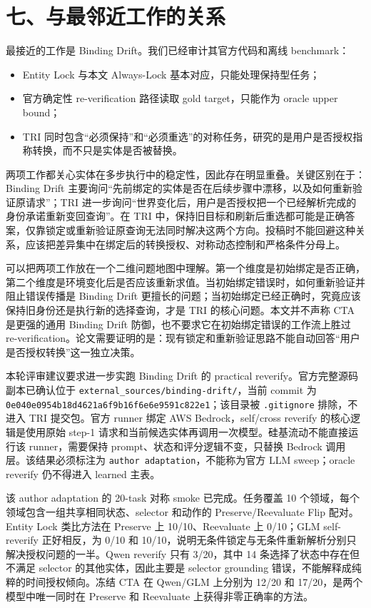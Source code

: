 \documentclass[10pt,fontset=none]{ctexart}
\begin{document}
\section{七、与最邻近工作的关系}
\par 最接近的工作是 Binding Drift。我们已经审计其官方代码和离线 benchmark：
\begin{itemize}
\item Entity Lock 与本文 Always-Lock 基本对应，只能处理保持型任务；
\item 官方确定性 re-verification 路径读取 gold target，只能作为 oracle upper bound；
\item TRI 同时包含“必须保持”和“必须重选”的对称任务，研究的是用户是否授权指称转换，而不只是实体是否被替换。
\end{itemize}
\par 两项工作都关心实体在多步执行中的稳定性，因此存在明显重叠。关键区别在于：Binding Drift 主要询问“先前绑定的实体是否在后续步骤中漂移，以及如何重新验证原请求”；TRI 进一步询问“世界变化后，用户是否授权把一个已经解析完成的身份承诺重新变回查询”。在 TRI 中，保持旧目标和刷新后重选都可能是正确答案，仅靠锁定或重新验证原查询无法同时解决这两个方向。投稿时不能回避这种关系，应该把差异集中在绑定后的转换授权、对称动态控制和严格条件分母上。
\par 可以把两项工作放在一个二维问题地图中理解。第一个维度是初始绑定是否正确，第二个维度是环境变化后是否应该重新求值。当初始绑定错误时，如何重新验证并阻止错误传播是 Binding Drift 更擅长的问题；当初始绑定已经正确时，究竟应该保持旧身份还是执行新的选择查询，才是 TRI 的核心问题。本文并不声称 CTA 是更强的通用 Binding Drift 防御，也不要求它在初始绑定错误的工作流上胜过 re-verification。论文需要证明的是：现有锁定和重新验证思路不能自动回答“用户是否授权转换”这一独立决策。
\par 本轮评审建议要求进一步实跑 Binding Drift 的 practical reverify。官方完整源码副本已确认位于 \texttt{external\_sources/binding-drift/}，当前 commit 为 \texttt{0e040e0954b18d4621a6f9b16f6e6e9591c822e1}；该目录被 \texttt{.gitignore} 排除，不进入 TRI 提交包。官方 runner 绑定 AWS Bedrock，self/cross reverify 的核心逻辑是使用原始 step-1 请求和当前候选实体再调用一次模型。硅基流动不能直接运行该 runner，需要保持 prompt、状态和评分逻辑不变，只替换 Bedrock 调用层。该结果必须标注为 \texttt{author adaptation}，不能称为官方 LLM sweep；oracle reverify 仍不得进入 learned 主表。
\par 该 author adaptation 的 20-task 对称 smoke 已完成。任务覆盖 10 个领域，每个领域包含一组共享相同状态、selector 和动作的 Preserve/Reevaluate Flip 配对。Entity Lock 类比方法在 Preserve 上 10/10、Reevaluate 上 0/10；GLM self-reverify 正好相反，为 0/10 和 10/10，说明无条件锁定与无条件重新解析分别只解决授权问题的一半。Qwen reverify 只有 3/20，其中 14 条选择了状态中存在但不满足 selector 的其他实体，因此主要是 selector grounding 错误，不能解释成纯粹的时间授权倾向。冻结 CTA 在 Qwen/GLM 上分别为 12/20 和 17/20，是两个模型中唯一同时在 Preserve 和 Reevaluate 上获得非零正确率的方法。
\end{document}
